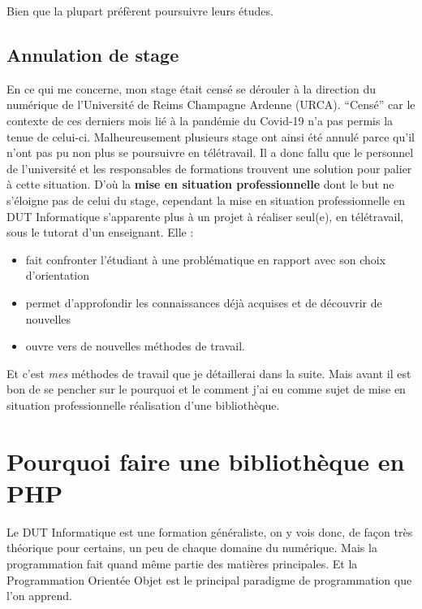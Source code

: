 \documentclass[11pt,a4paper,krantz2,11pt,oneside]{krantz}
\providecommand{\tightlist}{%
  \setlength{\itemsep}{0pt}\setlength{\parskip}{0pt}}
\begin{document}
Bien que la plupart préfèrent poursuivre leurs études.

\hypertarget{annulation-de-stage}{%
\subsection{Annulation de stage}\label{annulation-de-stage}}

En ce qui me concerne, mon stage était censé se dérouler à la direction du numérique de l'Université de Reims Champagne Ardenne (URCA). ``Censé'' car le contexte de ces derniers mois lié à la pandémie du Covid-19 n'a pas permis la tenue de celui-ci. Malheureusement plusieurs stage ont ainsi été annulé parce qu'il n'ont pas pu non plus se poursuivre en télétravail. Il a donc fallu que le personnel de l'université et les responsables de formations trouvent une solution pour palier à cette situation. D'où la \textbf{mise en situation professionnelle} dont le but ne s'éloigne pas de celui du stage, cependant la mise en situation professionnelle en DUT Informatique s'apparente plus à un projet à réaliser seul(e), en télétravail, sous le tutorat d'un enseignant. Elle :

\begin{itemize}
\tightlist
\item
  fait confronter l'étudiant à une problématique en rapport avec son choix d'orientation
\item
  permet d'approfondir les connaissances déjà acquises et de découvrir de nouvelles
\item
  ouvre vers de nouvelles méthodes de travail.
\end{itemize}

Et c'est \emph{mes} méthodes de travail que je détaillerai dans la suite. Mais avant il est bon de se pencher sur le pourquoi et le comment j'ai eu comme sujet de mise en situation professionnelle réalisation d'une bibliothèque.

\hypertarget{pourquoi-faire-une-bibliothuxe8que-en-php}{%
\section{Pourquoi faire une bibliothèque en PHP}\label{pourquoi-faire-une-bibliothuxe8que-en-php}}

Le DUT Informatique est une formation généraliste, on y vois donc, de façon très théorique pour certains, un peu de chaque domaine du numérique. Mais la programmation fait quand même partie des matières principales. Et la Programmation Orientée Objet est le principal paradigme de programmation que l'on apprend.
\end{document}
